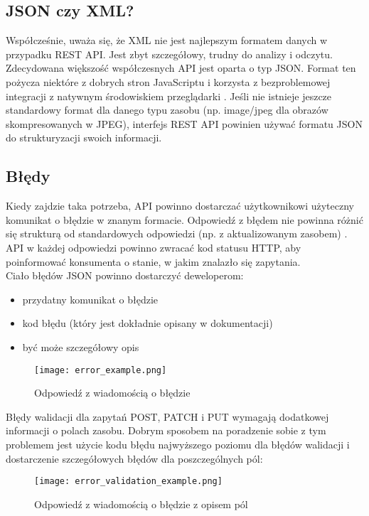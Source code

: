 	\subsection{JSON czy XML?}
		Współcześnie, uważa się, że XML nie jest najlepszym formatem danych w przypadku REST API. Jest zbyt szczegółowy, trudny do analizy i odczytu. Zdecydowana większość współczesnych API jest oparta o typ JSON. Format ten pożycza niektóre z dobrych stron JavaScriptu i korzysta z bezproblemowej integracji z natywnym środowiskiem przeglądarki \cite{RESTAPIDesignRulebook}. Jeśli nie istnieje jeszcze standardowy format dla danego typu zasobu (np. image/jpeg dla obrazów skompresowanych w JPEG), interfejs REST API powinien używać formatu JSON do strukturyzacji swoich informacji.
	
	\subsection{Błędy}
		Kiedy zajdzie taka potrzeba, API powinno dostarczać użytkownikowi użyteczny komunikat o błędzie w znanym formacie. Odpowiedź z błędem nie powinna różnić się strukturą od standardowych odpowiedzi (np. z aktualizowanym zasobem) \cite{BestPracticesWeb}. API w każdej odpowiedzi powinno zwracać kod statusu HTTP, aby poinformować konsumenta o stanie, w jakim znalazło się zapytania. \\
		Ciało błędów JSON powinno dostarczyć deweloperom:
		\begin{itemize}
			\item przydatny komunikat o błędzie
			\item kod błędu (który jest dokładnie opisany w dokumentacji)
			\item być może szczegółowy opis
		\end{itemize}
		\begin{figure}[H]
			\begin{center}
				\texttt{[image: error\_example.png]}
				\caption{\label{fig:error-message} Odpowiedź z wiadomością o błędzie}
			\end{center}
		\end{figure}
	
		Błędy walidacji dla zapytań POST, PATCH i PUT wymagają dodatkowej informacji o polach zasobu. Dobrym sposobem na poradzenie sobie z tym problemem jest użycie kodu błędu najwyższego poziomu dla błędów walidacji i dostarczenie szczegółowych błędów dla poszczególnych pól:
		\begin{figure}[H]
			\begin{center}
				\texttt{[image: error\_validation\_example.png]}
				\caption{\label{fig:error-validation-message} Odpowiedź z wiadomością o błędzie z opisem pól}
			\end{center}
		\end{figure}
	
